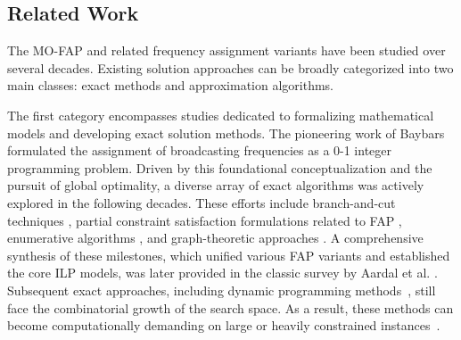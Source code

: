 \documentclass[letterpaper,journal]{IEEEtran}
\begin{document}
\subsection{Related Work}
The MO-FAP and related frequency assignment variants have been studied over several decades. Existing solution approaches can be broadly categorized into two main classes: exact methods and approximation algorithms.

The first category encompasses studies dedicated to formalizing mathematical models and developing exact solution methods. The pioneering work of Baybars \cite{Baybars1982} formulated the assignment of broadcasting frequencies as a 0-1 integer programming problem. Driven by this foundational conceptualization and the pursuit of global optimality, a diverse array of exact algorithms was actively explored in the following decades. These efforts include branch-and-cut techniques \cite{Aardal1996, Fischetti2000}, partial constraint satisfaction formulations related to FAP \cite{Koster1998}, enumerative algorithms \cite{Mannino2003}, and graph-theoretic approaches \cite{Kral2005}. A comprehensive synthesis of these milestones, which unified various FAP variants and established the core ILP models, was later provided in the classic survey by Aardal et al. \cite{Aardal2007}.
Subsequent exact approaches, including dynamic programming methods~\cite{Uyanik2014}, still face the combinatorial growth of the search space.
As a result, these methods can become computationally demanding on large or heavily constrained instances~\cite{Aardal2007,Uyanik2014}.
\end{document}
